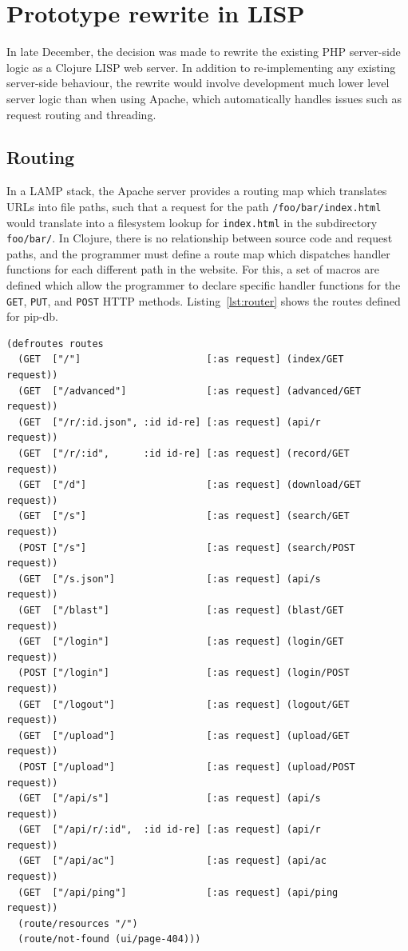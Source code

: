 \newpage
\section{Prototype rewrite in LISP}\label{sec:prototype-rewrite}
In late December, the decision was made to rewrite the existing PHP
server-side logic as a Clojure LISP web server. In addition to
re-implementing any existing server-side behaviour, the rewrite would
involve development much lower level server logic than when using
Apache, which automatically handles issues such as request routing and
threading.


\subsection{Routing}\label{subsec:routing}
In a LAMP stack, the Apache server provides a routing map which
translates URLs into file paths, such that a request for the path
\texttt{/foo/bar/index.html} would translate into a filesystem lookup
for \texttt{index.html} in the subdirectory \texttt{foo/bar/}. In
Clojure, there is no relationship between source code and request
paths, and the programmer must define a route map which dispatches
handler functions for each different path in the website. For this, a
set of macros are defined which allow the programmer to declare
specific handler functions for the \texttt{GET}, \texttt{PUT}, and
\texttt{POST} HTTP methods. Listing~\ref{lst:router} shows the routes
defined for pip-db.


\lstset{language=Clojure}
\begin{lstlisting}[label=lst:router,caption={%
      [Application ring handler routes]
      Application ring handler routes, taken from \texttt{middleware.clj}.}]
(defroutes routes
  (GET  ["/"]                      [:as request] (index/GET       request))
  (GET  ["/advanced"]              [:as request] (advanced/GET    request))
  (GET  ["/r/:id.json", :id id-re] [:as request] (api/r           request))
  (GET  ["/r/:id",      :id id-re] [:as request] (record/GET      request))
  (GET  ["/d"]                     [:as request] (download/GET    request))
  (GET  ["/s"]                     [:as request] (search/GET      request))
  (POST ["/s"]                     [:as request] (search/POST     request))
  (GET  ["/s.json"]                [:as request] (api/s           request))
  (GET  ["/blast"]                 [:as request] (blast/GET       request))
  (GET  ["/login"]                 [:as request] (login/GET       request))
  (POST ["/login"]                 [:as request] (login/POST      request))
  (GET  ["/logout"]                [:as request] (logout/GET      request))
  (GET  ["/upload"]                [:as request] (upload/GET      request))
  (POST ["/upload"]                [:as request] (upload/POST     request))
  (GET  ["/api/s"]                 [:as request] (api/s           request))
  (GET  ["/api/r/:id",  :id id-re] [:as request] (api/r           request))
  (GET  ["/api/ac"]                [:as request] (api/ac          request))
  (GET  ["/api/ping"]              [:as request] (api/ping        request))
  (route/resources "/")
  (route/not-found (ui/page-404)))
\end{lstlisting}


